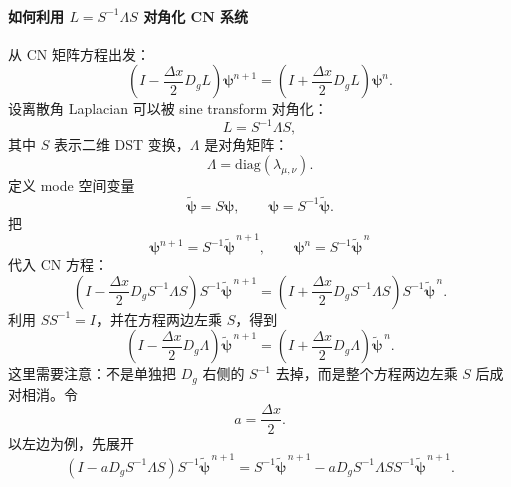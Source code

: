 \documentclass[11pt,a4paper]{ctexart}
\begin{document}
\paragraph{如何利用 \(L=S^{-1}\Lambda S\) 对角化 CN 系统}
从 CN 矩阵方程出发：
\begin{equation}
  \left(
    I-\frac{\Delta x}{2}D_gL
  \right)
  \boldsymbol\psi^{n+1}
  =
  \left(
    I+\frac{\Delta x}{2}D_gL
  \right)
  \boldsymbol\psi^n.
\end{equation}
设离散角 Laplacian 可以被 sine transform 对角化：
\begin{equation}
  L=S^{-1}\Lambda S,
\end{equation}
其中 \(S\) 表示二维 DST 变换，\(\Lambda\) 是对角矩阵：
\begin{equation}
  \Lambda
  =
  \mathrm{diag}(\lambda_{\mu,\nu}).
\end{equation}
定义 mode 空间变量
\begin{equation}
  \widetilde{\boldsymbol\psi}
  =
  S\boldsymbol\psi,
  \qquad
  \boldsymbol\psi
  =
  S^{-1}\widetilde{\boldsymbol\psi}.
\end{equation}
把
\begin{equation}
  \boldsymbol\psi^{n+1}=S^{-1}\widetilde{\boldsymbol\psi}^{\,n+1},
  \qquad
  \boldsymbol\psi^{n}=S^{-1}\widetilde{\boldsymbol\psi}^{\,n}
\end{equation}
代入 CN 方程：
\begin{equation}
  \left(
    I-\frac{\Delta x}{2}D_gS^{-1}\Lambda S
  \right)
  S^{-1}\widetilde{\boldsymbol\psi}^{\,n+1}
  =
  \left(
    I+\frac{\Delta x}{2}D_gS^{-1}\Lambda S
  \right)
  S^{-1}\widetilde{\boldsymbol\psi}^{\,n}.
\end{equation}
利用 \(SS^{-1}=I\)，并在方程两边左乘 \(S\)，得到
\begin{equation}
  \left(
    I-\frac{\Delta x}{2}D_g\Lambda
  \right)
  \widetilde{\boldsymbol\psi}^{\,n+1}
  =
  \left(
    I+\frac{\Delta x}{2}D_g\Lambda
  \right)
  \widetilde{\boldsymbol\psi}^{\,n}.
\end{equation}
这里需要注意：不是单独把 \(D_g\) 右侧的 \(S^{-1}\) 去掉，而是整个方程两边左乘 \(S\)
后成对相消。令
\begin{equation}
  a=\frac{\Delta x}{2}.
\end{equation}
以左边为例，先展开
\begin{equation}
  \left(I-aD_gS^{-1}\Lambda S\right)
  S^{-1}\widetilde{\boldsymbol\psi}^{\,n+1}
  =
  S^{-1}\widetilde{\boldsymbol\psi}^{\,n+1}
  -
  aD_gS^{-1}\Lambda SS^{-1}
  \widetilde{\boldsymbol\psi}^{\,n+1}.
\end{equation}
\end{document}
